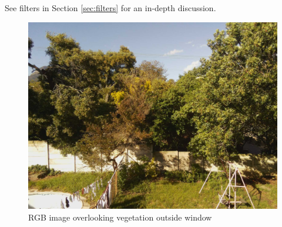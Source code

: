 \begin{appendices}
See filters in Section \ref{sec:filters} for an in-depth discussion.

\begin{figure}[H]
\centering
\includegraphics[scale=0.2]{filter/rgb.jpg}
\caption{RGB image overlooking vegetation outside window}
\label{fig:f_rgb}
\end{figure}


\end{appendices}
